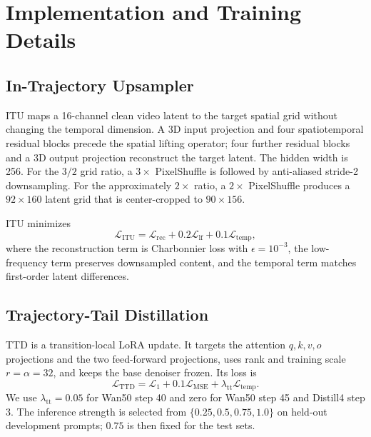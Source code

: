 \documentclass[letterpaper]{article}
\begin{document}
\section{Implementation and Training Details}

\subsection{In-Trajectory Upsampler}

ITU maps a 16-channel clean video latent to the target spatial grid without
changing the temporal dimension.  A 3D input projection and four
spatiotemporal residual blocks precede the spatial lifting operator; four
further residual blocks and a 3D output projection reconstruct the target
latent.  The hidden width is 256.  For the \(3/2\) grid ratio, a \(3\times\)
PixelShuffle is followed by anti-aliased stride-2 downsampling.  For the
approximately \(2\times\) ratio, a \(2\times\) PixelShuffle produces a
\(92\times160\) latent grid that is center-cropped to \(90\times156\).

ITU minimizes
\[
  \mathcal{L}_{\mathrm{ITU}}
  =\mathcal{L}_{\mathrm{rec}}
   +0.2\mathcal{L}_{\mathrm{lf}}
   +0.1\mathcal{L}_{\mathrm{temp}},
\]
where the reconstruction term is Charbonnier loss with
\(\epsilon=10^{-3}\), the low-frequency term preserves downsampled content,
and the temporal term matches first-order latent differences.

\subsection{Trajectory-Tail Distillation}

TTD is a transition-local LoRA update.  It targets the attention
\(q,k,v,o\) projections and the two feed-forward projections, uses rank and
training scale \(r=\alpha=32\), and keeps the base denoiser frozen.  Its loss is
\[
  \mathcal{L}_{\mathrm{TTD}}
  =\mathcal{L}_{1}+0.1\mathcal{L}_{\mathrm{MSE}}
   +\lambda_{\mathrm{tt}}\mathcal{L}_{\mathrm{temp}}.
\]
We use \(\lambda_{\mathrm{tt}}=0.05\) for Wan50 step 40 and zero for Wan50
step 45 and Distill4 step 3.  The inference strength is selected from
\(\{0.25,0.5,0.75,1.0\}\) on held-out development prompts; \(0.75\) is then
fixed for the test sets.
\end{document}
